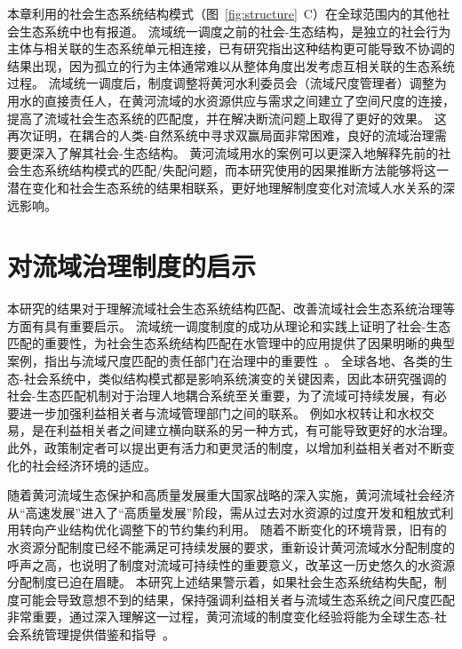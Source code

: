 本章利用的社会\textendash{}生态系统结构模式（图~\ref{fig:structure}~C）在全球范围内的其他社会\textendash{}生态系统中也有报道。
流域统一调度之前的社会-生态结构，是独立的社会行为主体与相关联的生态系统单元相连接，已有研究指出这种结构更可能导致不协调的结果出现，因为孤立的行为主体通常难以从整体角度出发考虑互相关联的生态系统过程\cite{sayles2017,sayles2019,cai2016,bergsten2019}。
流域统一调度后，制度调整将黄河水利委员会（流域尺度管理者）调整为用水的直接责任人，在黄河流域的水资源供应与需求之间建立了空间尺度的连接，提高了流域社会\textendash{}生态系统的匹配度，并在解决断流问题上取得了更好的效果\cite{cumming2020a,wang2019d}。
这再次证明，在耦合的人类-自然系统中寻求双赢局面非常困难\cite{hegwood2022}，良好的流域治理需要更深入了解其社会-生态结构\cite{bergsten2019, sayles2019}。
黄河流域用水的案例可以更深入地解释先前的社会\textendash{}生态系统结构模式的匹配/失配问题，而本研究使用的因果推断方法能够将这一潜在变化和社会\textendash{}生态系统的结果相联系，更好地理解制度变化对流域人\textendash{}水关系的深远影响。

\section{对流域治理制度的启示}

本研究的结果对于理解流域社会\textendash{}生态系统结构匹配、改善流域社会\textendash{}生态系统治理等方面有具有重要启示。
流域统一调度制度的成功从理论和实践上证明了社会-生态匹配的重要性，为社会\textendash{}生态系统结构匹配在水管理中的应用提供了因果明晰的典型案例，指出与流域尺度匹配的责任部门在治理中的重要性~\cite{bodin2017b, ostrom2009, reyers2018}。
全球各地、各类的生态-社会系统中，类似结构模式都是影响系统演变的关键因素，因此本研究强调的社会-生态匹配机制对于治理人地耦合系统至关重要，为了流域可持续发展，有必要进一步加强利益相关者与流域管理部门之间的联系。
例如水权转让和水权交易，是在利益相关者之间建立横向联系的另一种方式，有可能导致更好的水治理\cite{zhenghang2019}。
此外，政策制定者可以提出更有活力和更灵活的制度，以增加利益相关者对不断变化的社会经济环境的适应\cite{reyers2018}。

随着黄河流域生态保护和高质量发展重大国家战略的深入实施，黄河流域社会经济从“高速发展”进入了“高质量发展”阶段，需从过去对水资源的过度开发和粗放式利用转向产业结构优化调整下的节约集约利用。
随着不断变化的环境背景，旧有的水资源分配制度已经不能满足可持续发展的要求，重新设计黄河流域水分配制度的呼声之高，也说明了制度对流域可持续性的重要意义，改革这一历史悠久的水资源分配制度已迫在眉睫\cite{wang2019a}。
本研究上述结果警示着，如果社会\textendash{}生态系统结构失配，制度可能会导致意想不到的结果，保持强调利益相关者与流域生态系统之间尺度匹配非常重要，通过深入理解这一过程，黄河流域的制度变化经验将能为全球生态-社会系统管理提供借鉴和指导~\cite{hegwood2022, muneepeerakul2017, leslie2015}。

